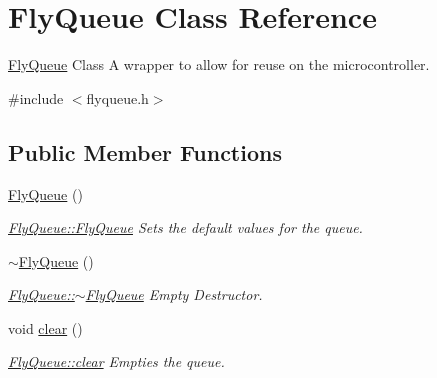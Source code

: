 \hypertarget{class_fly_queue}{}\section{Fly\+Queue Class Reference}
\label{class_fly_queue}


\hyperlink{class_fly_queue}{Fly\+Queue} Class A wrapper to allow for reuse on the microcontroller.  




{\ttfamily \#include $<$flyqueue.\+h$>$}

\subsection*{Public Member Functions}
\begin{DoxyCompactItemize}
\item 
\hypertarget{class_fly_queue_adc5d5138e7023af3697e3275b25d78d0}{}\label{class_fly_queue_adc5d5138e7023af3697e3275b25d78d0} 
\hyperlink{class_fly_queue_adc5d5138e7023af3697e3275b25d78d0}{Fly\+Queue} ()
\begin{DoxyCompactList}\small\item\em \hyperlink{class_fly_queue_adc5d5138e7023af3697e3275b25d78d0}{Fly\+Queue\+::\+Fly\+Queue} Sets the default values for the queue. \end{DoxyCompactList}\item 
\hypertarget{class_fly_queue_aba6188b6f39aac0a1386e72d30f0dd74}{}\label{class_fly_queue_aba6188b6f39aac0a1386e72d30f0dd74} 
\hyperlink{class_fly_queue_aba6188b6f39aac0a1386e72d30f0dd74}{$\sim$\+Fly\+Queue} ()
\begin{DoxyCompactList}\small\item\em \hyperlink{class_fly_queue_aba6188b6f39aac0a1386e72d30f0dd74}{Fly\+Queue\+::$\sim$\+Fly\+Queue} Empty Destructor. \end{DoxyCompactList}\item 
\hypertarget{class_fly_queue_ae4112aad97978a82e09f6ad5cfe7f5dc}{}\label{class_fly_queue_ae4112aad97978a82e09f6ad5cfe7f5dc} 
void \hyperlink{class_fly_queue_ae4112aad97978a82e09f6ad5cfe7f5dc}{clear} ()
\begin{DoxyCompactList}\small\item\em \hyperlink{class_fly_queue_ae4112aad97978a82e09f6ad5cfe7f5dc}{Fly\+Queue\+::clear} Empties the queue. \end{DoxyCompactList}\item 
\hypertarget{class_fly_queue_ac3f3e14584bf80481cb9fc9e0c14019a}{}\label{class_fly_queue_ac3f3e14584bf80481cb9fc9e0c14019a} 

\end{DoxyCompactItemize}

